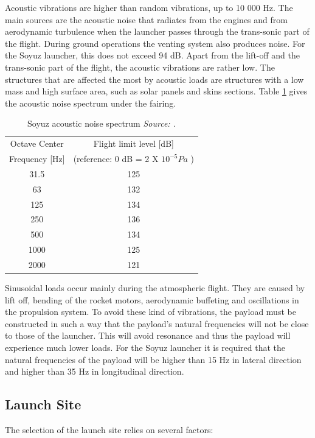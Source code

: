 Acoustic vibrations are higher than random vibrations, up to 10 000 Hz. The main sources are the acoustic noise that radiates from the engines and from aerodynamic turbulence when the launcher passes through the trans-sonic part of the flight. During ground operations the venting system also produces noise. For the Soyuz launcher, this does not exceed 94 dB. Apart from the lift-off and the trans-sonic part of the flight, the acoustic vibrations are rather low. The structures that are affected the most by acoustic loads are structures with a low mass and high surface area, such as solar panels and skins sections. Table \ref{tab:acoustic_vibr} gives the acoustic noise spectrum under the fairing.

\begin{table}[H!]
\centering
\begin{tabular}{cc}
\toprule
Octave Center & Flight limit level [dB]\\
Frequency [Hz] & (reference: 0 dB = 2 X $10^{-5} Pa$ ) \\
\midrule
31.5 & 125\\
63 & 132 \\
125 & 134 \\
250 & 136 \\
500 & 134 \\
1000 & 125 \\
2000 & 121 \\
\bottomrule
 \end{tabular}
 \caption{Soyuz acoustic noise spectrum \emph{ Source: \cite{soyuzman}.}}
\label{tab:acoustic_vibr}
\end{table}

Sinusoidal loads occur mainly during the atmospheric flight. They are caused by lift off, bending of the rocket motors, aerodynamic buffeting and oscillations in the propulsion system. To avoid these kind of vibrations, the payload must be constructed in such a way that the payload's natural frequencies will not be close to those of the launcher. This will avoid resonance and thus the payload will experience much lower loads. For the Soyuz launcher it is required that the natural frequencies of the payload will be higher than 15 Hz in lateral direction and higher than 35 Hz in longitudinal direction. 

\subsection{Launch Site}
\label{frLSLS}

The selection of the launch site relies on several factors:

